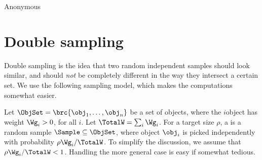 % 

\makeatletter
{}
\makeatother
\ifx\bookMode\undefined%
\fi
{}


\ChapterPrefix{}
\ChapterGen{}


%
{}%
{Anonymous}

\bigskip%





\section{Double sampling}

Double sampling is the idea that two random independent samples should
look similar, and should \emph{not} be completely different in the way
they intersect a certain set. We use the following sampling model,
which makes the computations somewhat easier.

\begin{defn}
    Let $\ObjSet = \brc{ \obj_1, \ldots, \obj_n}$ be a set of objects,
    where the $i$\th object has weight $\Wg_i > 0$, for all $i$. Let
    $\TotalW = \sum_i \Wg_i$.  For a target size $\rho$, a
     is a random sample
    $\Sample \subseteq \ObjSet$, where object $\obj_i$ is picked
    independently with probability
    $\displaystyle \rho \Wg_i / \TotalW$. To simplify the discussion,
    we assume that $\rho \Wg_i / \TotalW < 1$. Handling the more
    general case is easy if somewhat tedious.
\end{defn}


